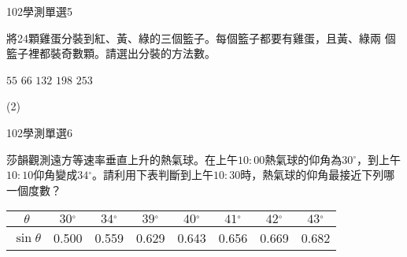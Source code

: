 \begin{QUESTIONS}
\begin{QUESTION}
\begin{QEMPTYSPACE}
        \end{QEMPTYSPACE}
    \end{QUESTION}
    \begin{QUESTION}
        \begin{ExamInfo}{102}{學測}{單選}{5}
        \end{ExamInfo}
        \begin{ExamAnsRateInfo}{50}{75}{50}{25}
        \end{ExamAnsRateInfo}
        \begin{QBODY}
            將24顆雞蛋分裝到紅、黃、綠的三個籃子。每個籃子都要有雞蛋，且黃、綠兩
			個籃子裡都裝奇數顆。請選出分裝的方法數。
			\begin{QOPS}
					\QOP $55  $
					\QOP $66  $
					\QOP $132 $
					\QOP $198 $
					\QOP $253 $
			\end{QOPS}
        \end{QBODY}
        \begin{QFROMS}
        \end{QFROMS}
        \begin{QTAGS}\end{QTAGS}
        \begin{QANS}
            (2)
        \end{QANS}
        \begin{QSOLLIST}
        \end{QSOLLIST}
        \begin{QEMPTYSPACE}
        \end{QEMPTYSPACE}
    \end{QUESTION}
    \begin{QUESTION}
        \begin{ExamInfo}{102}{學測}{單選}{6}
        \end{ExamInfo}
        \begin{ExamAnsRateInfo}{39}{71}{31}{15}
        \end{ExamAnsRateInfo}
        \begin{QBODY}
            莎韻觀測遠方等速率垂直上升的熱氣球。在上午$10:00$熱氣球的仰角為$30{}^\circ $，到上午$10:10$仰角變成$34{}^\circ $。請利用下表判斷到上午$10:30$時，熱氣球的仰角最接近下列哪一個度數？
			\begin{tabular}{|c|c|c|c|c|c|c|c|}
			\hline
			$\theta $		& $30{}^\circ $ & $34{}^\circ $ & 	$39{}^\circ $	&  $40{}^\circ $   & $41{}^\circ $ & $42{}^\circ $	& $43{}^\circ $  \\\hline
			$\sin \theta $	& 0.500	        &    0.559	    &       0.629	    &     0.643	       &   0.656	   &       0.669	&      0.682     \\\hline

\end{tabular}
\end{QBODY}
\end{QUESTION}
\end{QUESTIONS}

